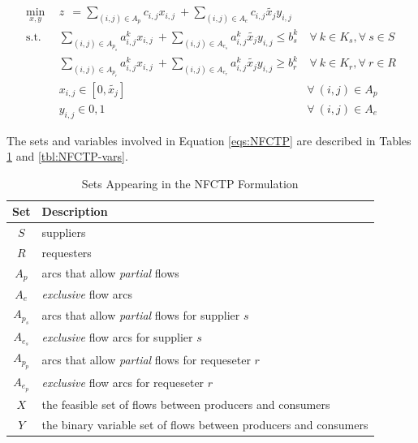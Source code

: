 \begin{subequations}\label{eqs:NFCTP}
  \begin{align}
    \min_{x, y} \:\: 
    & 
    z \:\: = 
    \sum_{(i, j) \in A_p} c_{i,j} x_{i,j} 
    \: + 
    \sum_{(i, j) \in A_e} c_{i,j} \tilde{x_j} y_{i,j} 
    & 
    \label{eqs:NFCTP_obj} \\
    \text{s.t.} \:\: 
    &
    \sum_{(i, j) \in A_{p_s}} a^k_{i,j} x_{i,j}
    \: + 
    \sum_{(i, j) \in A_{e_s}} a^k_{i,j} \tilde{x_j} y_{i,j}
    \leq b^k_s 
    &
    \: 
    \forall \: k \in K_s, 
    \forall \: s \in S 
    \label{eqs:NFCTP_sup} \\
    &
    \sum_{(i, j) \in A_{p_r}} a^k_{i,j} x_{i,j}
    \: + 
    \sum_{(i, j) \in A_{e_r}} a^k_{i,j} \tilde{x_j} y_{i,j}
    \geq b^k_r 
    &
    \: 
    \forall \: k \in K_r,  
    \forall \: r \in R 
    \label{eqs:NFCTP_req} \\
    &
    x_{i,j} \in [0, \tilde{x_j}]
    &
    \forall \: (i, j) \in A_p
    \label{eqs:NFCTP_x} \\
    &
    y_{i,j} \in {0, 1}
    &
    \forall \: (i, j) \in A_e
    \label{eqs:NFCTP_y}
  \end{align}
\end{subequations}

The sets and variables involved in Equation \ref{eqs:NFCTP} are described in
Tables \ref{tbl:NFCTP-sets} and \ref{tbl:NFCTP-vars}.

\begin{table} [h!]
\centering
\begin{tabularx}{\columnwidth-10pt}{|c|X|} %
\hline
Set         & Description \\
\hline
$S$     & suppliers \\
$R$     & requesters \\
$A_p$     & arcs that allow \textit{partial} flows \\
$A_e$     & \textit{exclusive} flow arcs  \\
$A_{p_s}$     & arcs that allow \textit{partial} flows for supplier $s$ \\
$A_{e_s}$     & \textit{exclusive} flow arcs for supplier $s$ \\
$A_{p_p}$     & arcs that allow \textit{partial} flows for requeseter $r$ \\
$A_{e_p}$     & \textit{exclusive} flow arcs for requeseter $r$ \\
$X$         & the feasible set of flows between producers and consumers  \\
$Y$         & the binary variable set of flows between producers and consumers  \\
\hline
\end{tabularx}
\caption{Sets Appearing in the NFCTP Formulation}
\label{tbl:NFCTP-sets}
\end{table}

